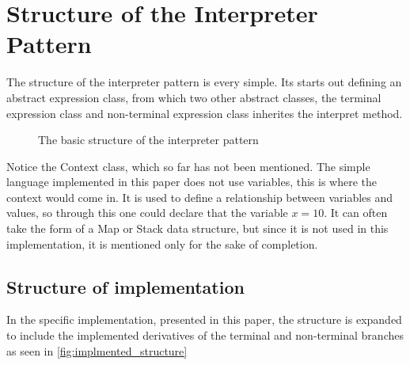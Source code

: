 \section{Structure of the Interpreter Pattern}

The structure of the interpreter pattern is every simple.
Its starts out defining an abstract expression class, from which
two other abstract classes, the terminal expression class and non-terminal
expression class inherites the interpret method.

\begin{figure}[h]
  \centering
  \caption{The basic structure of the interpreter pattern}%
  \label{fig:basic_interpreter_structure}
\end{figure}

\noindent Notice the Context class, which so far has not been mentioned. The simple
language implemented in this paper does not use variables, this is 
where the context would come in. It is used to define a relationship between
variables and values, so through this one could declare that the variable
$ x = 10 $. It can often take the form of a Map or Stack data structure, but
since it is not used in this implementation, it is mentioned only for the sake
of completion.

\newpage

\subsection{Structure of implementation}
In the specific implementation, presented in this paper, the structure is
expanded to include the implemented derivatives of the terminal and non-terminal
branches as seen in \autoref{fig:implmented_structure}

